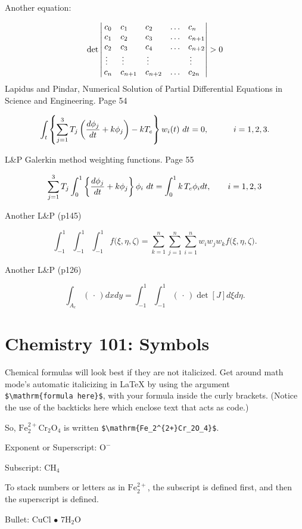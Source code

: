 \documentclass[12pt,twoside]{Mactemplate}
\theoremstyle{definition}
\theoremstyle{definition}
\theoremstyle{definition}
\theoremstyle{remark}
\begin{document}
Another equation:

\[\det\left|\,\begin{matrix}%
c_0&c_1\hfill&c_2\hfill&\ldots&c_n\hfill\cr
c_1&c_2\hfill&c_3\hfill&\ldots&c_{n+1}\hfill\cr
c_2&c_3\hfill&c_4\hfill&\ldots&c_{n+2}\hfill\cr
\,\vdots\hfill&\,\vdots\hfill&
  \,\vdots\hfill&&\,\vdots\hfill\cr
c_n&c_{n+1}\hfill&c_{n+2}\hfill&\ldots&c_{2n}\hfill\cr
\end{matrix}\right|>0\]
Lapidus and Pindar, Numerical Solution of Partial Differential Equations
in Science and Engineering. Page 54

\[
\int_t\left\{\sum_{j=1}^3 T_j \left({d\phi_j\over dt}+k\phi_j\right)-kT_e\right\}w_i(t)\ dt=0,
   \qquad\quad i=1,2,3.
\]

L\&P Galerkin method weighting functions. Page 55

\[
\sum_{j=1}^3 T_j\int_0^1\left\{{d\phi_j\over dt} + k\phi_j\right\} \phi_i\ dt
   = \int_{0}^1k\,T_e\phi_idt, \qquad i=1,2,3 \]

Another L\&P (p145)

\[
\int_{-1}^1\!\int_{-1}^1\!\int_{-1}^1 f\big(\xi,\eta,\zeta\big)
   = \sum_{k=1}^n\sum_{j=1}^n\sum_{i=1}^n w_i w_j w_k f\big( \xi,\eta,\zeta\big).
\]

Another L\&P (p126)

\[
\int_{A_e} (\,\cdot\,) dx dy = \int_{-1}^1\!\int_{-1}^1 (\,\cdot\,) \det[J] d\xi d\eta.
\]

\section{Chemistry 101: Symbols}\label{chemistry-101-symbols}

Chemical formulas will look best if they are not italicized. Get around
math mode's automatic italicizing in LaTeX by using the argument
\texttt{\$\textbackslash{}mathrm\{formula\ here\}\$}, with your formula
inside the curly brackets. (Notice the use of the backticks here which
enclose text that acts as code.)

So, \(\mathrm{Fe_2^{2+}Cr_2O_4}\) is written
\texttt{\$\textbackslash{}mathrm\{Fe\_2\^{}\{2+\}Cr\_2O\_4\}\$}.

\noindent Exponent or Superscript: \(\mathrm{O^-}\)

\noindent Subscript: \(\mathrm{CH_4}\)

To stack numbers or letters as in \(\mathrm{Fe_2^{2+}}\), the subscript
is defined first, and then the superscript is defined.

\noindent Bullet: CuCl \(\bullet\) \(\mathrm{7H_{2}O}\)
\end{document}
